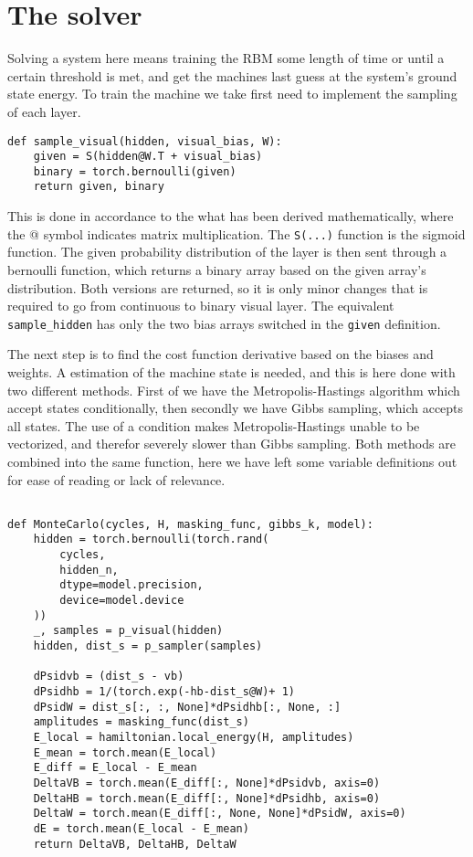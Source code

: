 \section{The solver}

Solving a system here means training the RBM some length of time or until a certain threshold is met, and get the machines last guess at the system's ground state energy. To train the machine we take first need to implement the sampling of each layer.

\begin{verbatim}
def sample_visual(hidden, visual_bias, W):
    given = S(hidden@W.T + visual_bias)
    binary = torch.bernoulli(given)
    return given, binary
\end{verbatim}

This is done in accordance to the what has been derived mathematically, where the @ symbol indicates matrix multiplication. The \texttt{S(...)} function is the sigmoid function. The given probability distribution of the layer is then sent through a bernoulli function, which returns a binary array based on the given array's distribution. Both versions are returned, so it is only minor changes that is required to go from continuous to binary visual layer. The equivalent \texttt{sample_hidden} has only the two bias arrays switched in the \texttt{given} definition.

The next step is to find the cost function derivative based on the biases and weights. A estimation of the machine state is needed, and this is here done with two different methods. First of we have the Metropolis-Hastings algorithm which accept states conditionally, then secondly we have Gibbs sampling, which accepts all states. The use of a condition makes Metropolis-Hastings unable to be vectorized, and therefor severely slower than Gibbs sampling. Both methods are combined into the same function, here we have left some variable definitions out for ease of reading or lack of relevance.

\begin{verbatim}

def MonteCarlo(cycles, H, masking_func, gibbs_k, model):
    hidden = torch.bernoulli(torch.rand(
        cycles, 
        hidden_n, 
        dtype=model.precision, 
        device=model.device
    ))
    _, samples = p_visual(hidden)
    hidden, dist_s = p_sampler(samples)
    
    dPsidvb = (dist_s - vb)
    dPsidhb = 1/(torch.exp(-hb-dist_s@W)+ 1)
    dPsidW = dist_s[:, :, None]*dPsidhb[:, None, :]
    amplitudes = masking_func(dist_s)
    E_local = hamiltonian.local_energy(H, amplitudes)
    E_mean = torch.mean(E_local)
    E_diff = E_local - E_mean
    DeltaVB = torch.mean(E_diff[:, None]*dPsidvb, axis=0)
    DeltaHB = torch.mean(E_diff[:, None]*dPsidhb, axis=0)
    DeltaW = torch.mean(E_diff[:, None, None]*dPsidW, axis=0)
    dE = torch.mean(E_local - E_mean)      
    return DeltaVB, DeltaHB, DeltaW

\end{verbatim}

